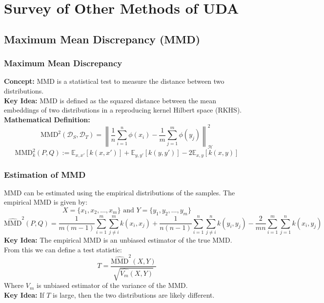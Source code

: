 \documentclass{beamer}
\begin{document}
\section{Survey of Other Methods of UDA}

\subsection{Maximum Mean Discrepancy (MMD)}
\begin{frame}
    \frametitle{Maximum Mean Discrepancy}
    \textbf{Concept:} MMD is a statistical test to measure the distance between two distributions.\\
    \textbf{Key Idea:} MMD is defined as the squared distance between the mean embeddings of two distributions in a reproducing kernel Hilbert space (RKHS).\\
    \textbf{Mathematical Definition:}
    \[
        \text{MMD}^2(\mathcal{D}_S, \mathcal{D}_T) = \left\| \frac{1}{n} \sum_{i=1}^{n} \phi(x_i) - \frac{1}{m} \sum_{j=1}^{m} \phi(y_j) \right\|_{\mathcal{H}}^2
    \]
    \[
        \text{MMD}^2_k(P,Q) := \mathbb{E}_{x,x'}[k(x,x')] + \mathbb{E}_{y,y'}[k(y,y')] - 2\mathbb{E}_{x,y}[k(x,y)]
    \]   
\end{frame}

\begin{frame}
    \frametitle{Estimation of MMD}
    MMD can be estimated using the empirical distributions of the samples. The empirical MMD is given by:
    \[
         X = \{x_1, x_2, \ldots, x_m\} \text{ and } Y = \{y_1, y_2, \ldots, y_m\}
    \]
    \scriptsize \[
        \widehat{\text{MMD}}^2(P, Q) = \frac{1}{m(m-1)} \sum_{i=1}^{m} \sum_{j \neq i}^{m} k(x_i, x_j) + \frac{1}{n(n-1)} \sum_{i=1}^{n} \sum_{j \neq i}^{n} k(y_i, y_j) - \frac{2}{mn} \sum_{i=1}^{m} \sum_{j=1}^{n} k(x_i, y_j)
    \]
    \normalsize
    \textbf{Key Idea:} The empirical MMD is an unbiased estimator of the true MMD.\\
    From this we can define a test statistic:
    \[
        T = \frac{\hat{\text{MMD}}^2(X,Y)}{\sqrt{\hat{V_m}(X,Y)}}
    \]
    Where \(V_m\) is unbiased estimator of the variance of the MMD.\\
    \textbf{Key Idea:} If \(T\) is large, then the two distributions are likely different.\\

\end{frame}
\end{document}
